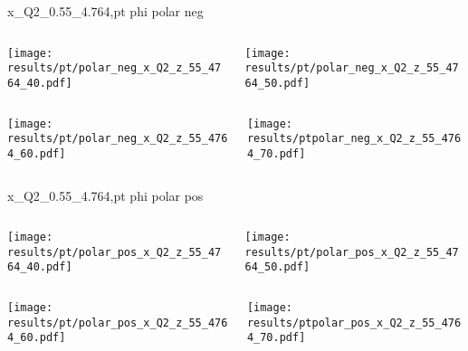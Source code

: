\begin{frame}{x\_Q2\_0.55\_4.764,pt phi polar neg}
\begin{columns}
\begin{column}[T]{0.5\textwidth}
\texttt{[image: results/pt/polar\_neg\_x\_Q2\_z\_55\_4764\_40.pdf]}
\end{column}
\begin{column}[T]{0.5\textwidth}
\texttt{[image: results/pt/polar\_neg\_x\_Q2\_z\_55\_4764\_50.pdf]}
\end{column}
\end{columns}
\begin{columns}
\begin{column}[T]{0.5\textwidth}
\texttt{[image: results/pt/polar\_neg\_x\_Q2\_z\_55\_4764\_60.pdf]}
\end{column}
\begin{column}[T]{0.5\textwidth}
\texttt{[image: results/ptpolar\_neg\_x\_Q2\_z\_55\_4764\_70.pdf]}
\end{column}
\end{columns}
\end{frame}
\begin{frame}{x\_Q2\_0.55\_4.764,pt phi polar pos}
\begin{columns}
\begin{column}[T]{0.5\textwidth}
\texttt{[image: results/pt/polar\_pos\_x\_Q2\_z\_55\_4764\_40.pdf]}
\end{column}
\begin{column}[T]{0.5\textwidth}
\texttt{[image: results/pt/polar\_pos\_x\_Q2\_z\_55\_4764\_50.pdf]}
\end{column}
\end{columns}
\begin{columns}
\begin{column}[T]{0.5\textwidth}
\texttt{[image: results/pt/polar\_pos\_x\_Q2\_z\_55\_4764\_60.pdf]}
\end{column}
\begin{column}[T]{0.5\textwidth}
\texttt{[image: results/ptpolar\_pos\_x\_Q2\_z\_55\_4764\_70.pdf]}
\end{column}
\end{columns}
\end{frame}
